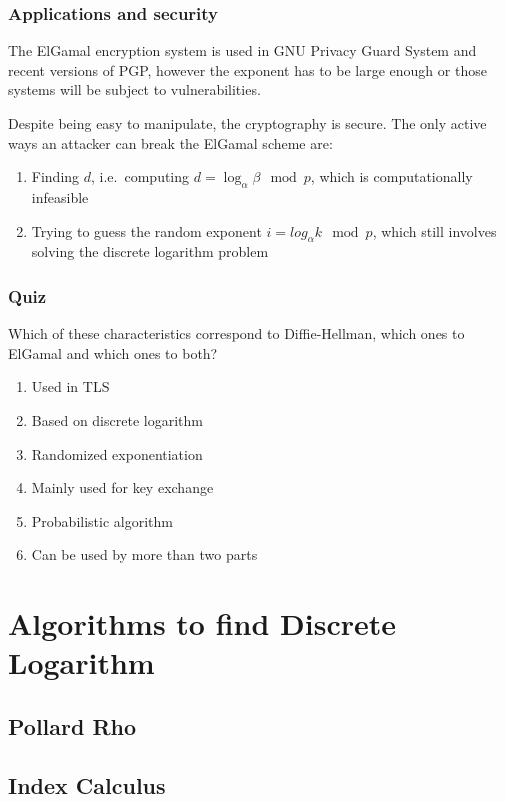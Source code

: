 \documentclass{beamer}
\begin{document}
\begin{frame}
\frametitle{Applications and security}

The ElGamal encryption system is used in GNU Privacy Guard System and recent versions of PGP, however the exponent has to be large enough or those systems will be subject to vulnerabilities.

Despite being easy to manipulate, the cryptography is secure. The only  active ways an attacker can break the ElGamal scheme are:
\begin{enumerate}
	\item Finding $d$, i.e.\ computing $d = \log_\alpha \beta \mod p$, which is computationally infeasible
	\item Trying to guess the random exponent $i = log_\alpha k \mod p$, which still involves solving the discrete logarithm problem
\end{enumerate}
  
\end{frame}


\begin{frame}
\frametitle{Quiz}
Which of these characteristics correspond to Diffie-Hellman, which ones to ElGamal and which ones to both?
\begin{enumerate}
    \item Used in TLS
    \item Based on discrete logarithm
    \item Randomized exponentiation
    \item Mainly used for key exchange
    \item Probabilistic algorithm
    \item Can be used by more than two parts
\end{enumerate}
\end{frame}


\section{Algorithms to find Discrete Logarithm}
\subsection{Pollard Rho}
\subsection{Index Calculus}
\end{document}
